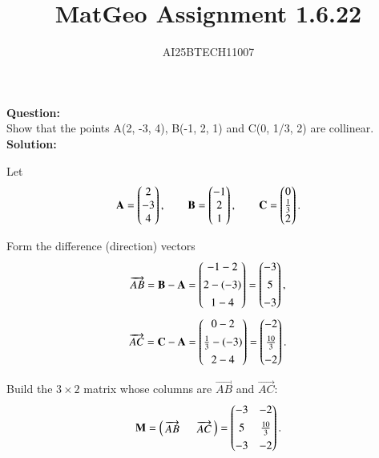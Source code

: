 \documentclass[journal]{IEEEtran}
\begin{document}

\vspace{3cm}

\title{MatGeo Assignment 1.6.22}
\author{AI25BTECH11007}
 \maketitle
{\let\newpage\relax\maketitle}

\renewcommand{\thefigure}{\theenumi}
\renewcommand{\thetable}{\theenumi}
\setlength{\intextsep}{10pt} %


\renewcommand{\thetable}{\theenumi}
\noindent
\textbf{Question:}\\
Show that the points A(2, -3, 4), B(-1, 2, 1) and C(0, 1/3, 2) are collinear.\\
\noindent
\textbf{Solution:}

Let
\begin{equation}
\mathbf{A}=\begin{pmatrix}2\\-3\\4\end{pmatrix},\qquad
\mathbf{B}=\begin{pmatrix}-1\\2\\1\end{pmatrix},\qquad
\mathbf{C}=\begin{pmatrix}0\\\tfrac{1}{3}\\2\end{pmatrix}.
\label{eq:points}
\end{equation}

Form the difference (direction) vectors
\begin{equation}
\overrightarrow{AB}=\mathbf{B}-\mathbf{A}=\begin{pmatrix}-1-2\\[4pt]2-(-3)\\[4pt]1-4\end{pmatrix}=\begin{pmatrix}-3\\[4pt]5\\[4pt]-3\end{pmatrix},
\label{eq:AB}
\end{equation}
\begin{equation}
\overrightarrow{AC}=\mathbf{C}-\mathbf{A}=\begin{pmatrix}0-2\\[4pt]\tfrac{1}{3}-(-3)\\[4pt]2-4\end{pmatrix}
=\begin{pmatrix}-2\\[4pt]\tfrac{10}{3}\\[4pt]-2\end{pmatrix}.
\label{eq:AC}
\end{equation}

Build the $3\times 2$ matrix whose columns are $\overrightarrow{AB}$ and $\overrightarrow{AC}$:
\begin{equation}
\mathbf{M}=\begin{pmatrix}\,\overrightarrow{AB}\; & \; \overrightarrow{AC}\,\end{pmatrix}
=\begin{pmatrix} -3 & -2 \\[4pt] 5 & \tfrac{10}{3} \\[4pt] -3 & -2 \end{pmatrix}.
\label{eq:matrixM}
\end{equation}
\end{document}
